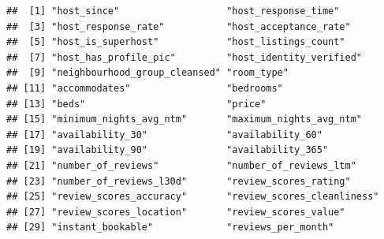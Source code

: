 \begin{verbatim}
##  [1] "host_since"                   "host_response_time"          
##  [3] "host_response_rate"           "host_acceptance_rate"        
##  [5] "host_is_superhost"            "host_listings_count"         
##  [7] "host_has_profile_pic"         "host_identity_verified"      
##  [9] "neighbourhood_group_cleansed" "room_type"                   
## [11] "accommodates"                 "bedrooms"                    
## [13] "beds"                         "price"                       
## [15] "minimum_nights_avg_ntm"       "maximum_nights_avg_ntm"      
## [17] "availability_30"              "availability_60"             
## [19] "availability_90"              "availability_365"            
## [21] "number_of_reviews"            "number_of_reviews_ltm"       
## [23] "number_of_reviews_l30d"       "review_scores_rating"        
## [25] "review_scores_accuracy"       "review_scores_cleanliness"   
## [27] "review_scores_location"       "review_scores_value"         
## [29] "instant_bookable"             "reviews_per_month"
\end{verbatim}

